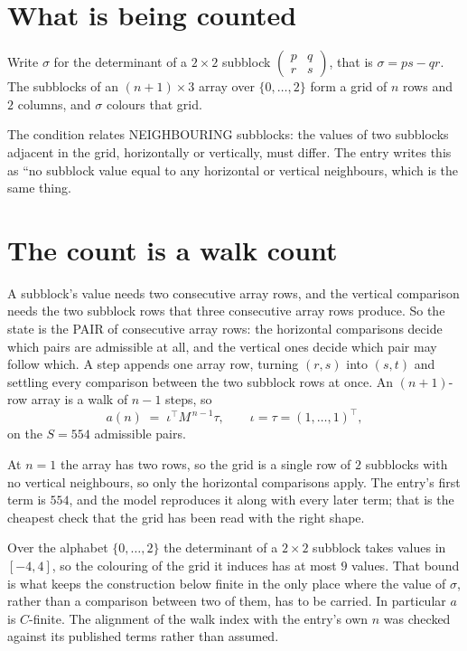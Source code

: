 \documentclass[11pt,a4paper]{article}
\theoremstyle{plain}
\theoremstyle{definition}
\begin{document}
\section{What is being counted}

Write $\sigma$ for the determinant of a $2\times2$ subblock
$\begin{pmatrix}p&q\\r&s\end{pmatrix}$, that is $\sigma=ps-qr$. The subblocks of an
$(n+1)\times3$ array over $\{0,\dots,2\}$ form a grid of $n$ rows and $2$
columns, and $\sigma$ colours that grid.

The condition relates NEIGHBOURING subblocks: the values of two subblocks adjacent in the grid,
horizontally or vertically, must differ. The entry writes this as ``no subblock value equal to any horizontal or vertical neighbours, which is the same thing.

\section{The count is a walk count}

A subblock's value needs two consecutive array rows, and the vertical
comparison needs the two subblock rows that three consecutive array rows produce. So the state
is the PAIR of consecutive array rows: the horizontal comparisons decide which pairs are
admissible at all, and the vertical ones decide which pair may follow which. A step appends one
array row, turning $(r,s)$ into $(s,t)$ and settling every comparison between the two subblock
rows at once. An $(n+1)$-row array is a walk of $n-1$ steps, so
\[
a(n)\;=\;\iota^{\!\top}M^{\,n-1}\tau,\qquad\iota=\tau=(1,\dots,1)^{\!\top},
\]
on the $S=554$ admissible pairs.

At $n=1$ the array has two rows, so the grid is a single row of $2$
subblocks with no vertical neighbours, so only the horizontal comparisons apply. The
entry's first term is $554$, and the model reproduces it along with every later term; that
is the cheapest check that the grid has been read with the right shape.

Over the alphabet $\{0,\dots,2\}$ the determinant of a $2\times2$ subblock takes values in
$[-4,4]$, so the colouring of the grid it induces has at most $9$ values.
That bound is what keeps the construction below finite in the only place where the value of
$\sigma$, rather than a comparison between two of them, has to be carried.
In particular $a$ is $C$-finite. The alignment of the walk index with the entry's own $n$ was
checked against its published terms rather than assumed.
\end{document}
